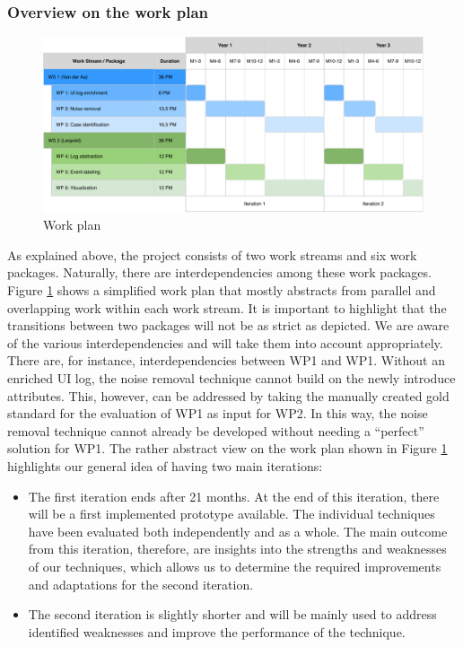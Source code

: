 \subsubsection{Overview on the work plan}

\begin{figure}[bt]
	\includegraphics[width=\textwidth]{Figures/Gantt.pdf}
	\caption{Work plan}
	\label{fig:workplan}
\end{figure}

As explained above, the project consists of two work streams and six work packages. Naturally, there are interdependencies among these work packages. Figure \ref{fig:workplan} shows a simplified work plan that mostly abstracts from parallel and overlapping work within each work stream. It is important to highlight that the transitions between two packages will not be as strict as depicted. We are aware of the various interdependencies and will take them into account appropriately.  
There are, for instance, interdependencies between WP1 and WP1. Without an enriched UI log, the noise removal technique cannot build on the newly introduce attributes. This, however, can be addressed by taking the manually created gold standard for the evaluation of WP1 as input for WP2. In this way, the noise removal technique cannot already be developed without needing a ``perfect'' solution for WP1. The rather abstract view on the work plan shown in Figure \ref{fig:workplan} highlights our general idea of having two main iterations:
\begin{itemize}
	\item The first iteration ends after 21 months. At the end of this iteration, there will be a first implemented prototype available. The individual techniques have been evaluated both independently and as a whole. The main outcome from this iteration, therefore, are insights into the strengths and weaknesses of our techniques, which allows us to determine the required improvements and adaptations for the second iteration. 
	\item The second iteration is slightly shorter and will be mainly used to address identified weaknesses and improve the performance of the technique.
\end{itemize} 

